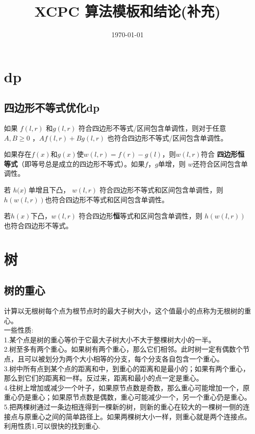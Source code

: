 \documentclass[a4paper]{report}
\title{XCPC 算法模板和结论(补充)}
\date{\today}
\begin{document}
\maketitle
\tableofcontents
\clearpage

\chapter{dp}
\section{四边形不等式优化dp}
如果 $f(l,r)$ 和$ g(l,r)$ 符合四边形不等式/区间包含单调性，则对于任意 $A,B≥0$ ，$ Af(l,r)+Bg(l,r)$ 也符合四边形不等式/区间包含单调性。

如果存在$f(x) $和$ g(x) $使$ w(l,r)=f(r)−g(l) $，则$ w(l,r) $符合 \textbf{四边形恒等式}（即等号总是成立的四边形不等式）。如果$ f ， g $单增，则 $w $还符合区间包含单调性。

若 $h(x$) 单增且下凸， $w(l,r)$ 符合四边形不等式和区间包含单调性，则$ h(w(l,r)) $也符合四边形不等式和区间包含单调性。

若$ h(x) $下凸，$w(l,r)$ 符合四边形\textbf{恒}等式和区间包含单调性，则 $h(w(l,r))$ 也符合四边形不等式。

\chapter{树}
\section{树的重心}
计算以无根树每个点为根节点时的最大子树大小，这个值最小的点称为无根树的重心。\\
一些性质:\\
1.某个点是树的重心等价于它最大子树大小不大于整棵树大小的一半。\\
2.树至多有两个重心。如果树有两个重心，那么它们相邻。此时树一定有偶数个节点，且可以被划分为两个大小相等的分支，每个分支各自包含一个重心。\\
3.树中所有点到某个点的距离和中，到重心的距离和是最小的；如果有两个重心，那么到它们的距离和一样。反过来，距离和最小的点一定是重心。\\
4.往树上增加或减少一个叶子，如果原节点数是奇数，那么重心可能增加一个，原重心仍是重心；如果原节点数是偶数，重心可能减少一个，另一个重心仍是重心。\\
5.把两棵树通过一条边相连得到一棵新的树，则新的重心在较大的一棵树一侧的连接点与原重心之间的简单路径上。如果两棵树大小一样，则重心就是两个连接点。\\
利用性质1,可以很快的找到重心.
\end{document}
